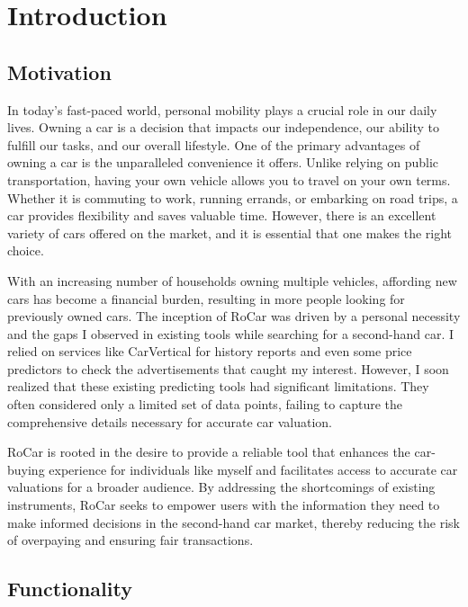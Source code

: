 \chapter{Introduction}

\section{Motivation}

In today's fast-paced world, personal mobility plays a crucial role in our daily lives. Owning a car is a decision that impacts our independence, our ability to fulfill our tasks, and our overall lifestyle. One of the primary advantages of owning a car is the unparalleled convenience it offers. Unlike relying on public transportation, having your own vehicle allows you to travel on your own terms. Whether it is commuting to work, running errands, or embarking on road trips, a car provides flexibility and saves valuable time. However, there is an excellent variety of cars offered on the market, and it is essential that one makes the right choice.

With an increasing number of households owning multiple vehicles, affording new cars has become a financial burden, resulting in more people looking for previously owned cars. The inception of RoCar was driven by a personal necessity and the gaps I observed in existing tools while searching for a second-hand car. I relied on services like CarVertical \cite{carVertical} for history reports and even some price predictors to check the advertisements that caught my interest. However, I soon realized that these existing predicting tools had significant limitations. They often considered only a limited set of data points, failing to capture the comprehensive details necessary for accurate car valuation.

RoCar is rooted in the desire to provide a reliable tool that enhances the car-buying experience for individuals like myself and facilitates access to accurate car valuations for a broader audience. By addressing the shortcomings of existing instruments, RoCar seeks to empower users with the information they need to make informed decisions in the second-hand car market, thereby reducing the risk of overpaying and ensuring fair transactions.

\section{Functionality}


